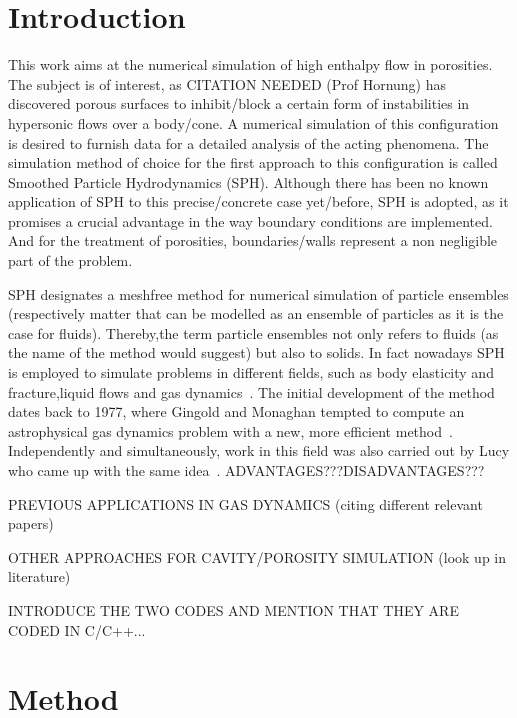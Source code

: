 \documentclass{report}
\begin{document}


\tableofcontents
\chapter{Introduction}
\label{sec:intro}


This work aims at the numerical simulation of high enthalpy flow in
porosities. The subject is of interest, as CITATION
NEEDED (Prof Hornung) has discovered porous surfaces to inhibit/block a
certain form of instabilities in hypersonic flows over a body/cone. A numerical
simulation of this configuration is desired to furnish data for a detailed
analysis of the acting phenomena. The simulation method of choice for the first approach
to this configuration is called Smoothed Particle Hydrodynamics (SPH). Although
there has been no known application of SPH to this precise/concrete case yet/before,
SPH is adopted, as it promises a crucial advantage in the way boundary
conditions are implemented. And for the treatment of porosities,
boundaries/walls represent a non negligible part of the problem.

SPH designates a meshfree method for numerical simulation of particle
ensembles (respectively matter that can be modelled as an ensemble of
particles as it is the case for fluids).
Thereby,the term particle ensembles not only refers
to fluids (as the name of the method would suggest) but also to solids. In
fact nowadays SPH is employed to simulate problems in different fields,
such as body elasticity and fracture,liquid flows and gas
dynamics~\cite{Monaghan2005}.
The initial development of the method dates back to 1977, where Gingold and
Monaghan tempted to compute an astrophysical gas dynamics problem with a new, more
efficient method~\cite{Gingold1977}. Independently and simultaneously, work in
this field was also carried out by Lucy who came up with the same
idea~\cite{Lucy1977}.
ADVANTAGES???DISADVANTAGES???

PREVIOUS APPLICATIONS IN GAS DYNAMICS (citing different relevant papers)

OTHER APPROACHES FOR CAVITY/POROSITY SIMULATION (look up in literature)

INTRODUCE THE TWO CODES AND MENTION THAT THEY ARE CODED IN C/C++...



\chapter{Method}
\label{sec:method}
\end{document}
